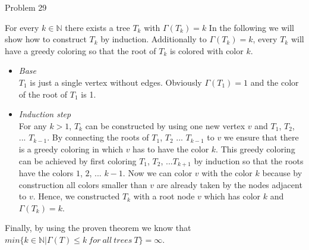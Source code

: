 \documentclass[a4paper]{article}
\begin{document}
	\begin{solution}{Problem 29}
		\begin{theorem}{For every $k \in \mathbb{N} $ there exists a tree $T_k$ with $\Gamma (T_k) = k$}
			In the following we will show how to construct $T_k$ by induction. 
			Additionally to $\Gamma (T_k) = k$, every $T_k$ will have a greedy coloring so that the root of $T_k$ is colored with color $k$.  
			\begin{itemize}
				\item \emph{Base} \\
					$T_1$ is just a single vertex without edges. Obviously $\Gamma (T_1) = 1$ and the color of the root of $T_1$ is 1.
				\item \emph{Induction step} \\
					For any $k > 1$, $T_k$ can be constructed by using one new vertex $v$ and $T_1$, $T_2$, ... $T_{k-1}$. 
					By connecting the roots of $T_1$, $T_2$ ... $T_{k-1}$ to $v$ we ensure that there is a greedy coloring in which $v$ has to have the color $k$. 
					This greedy coloring can be achieved by first coloring $T_1$, $T_2$, ...$T_{k+1}$ by induction so that the roots have the colors $1$, $2$, ... $k-1$. 
					Now we can color $v$ with the color $k$ because by construction all colors smaller than $v$ are already taken by the nodes adjacent to $v$. 
					Hence, we constructed $T_k$ with a root node $v$ which has color $k$ and $\Gamma (T_k) = k$. 
			\end{itemize}
		\end{theorem}
		Finally, by using the proven theorem we know that $min\{k \in \mathbb{N} | \Gamma(T) \leq k\ for\ all\ trees\ T\} = \infty$. 
		

\end{solution}
\end{document}

